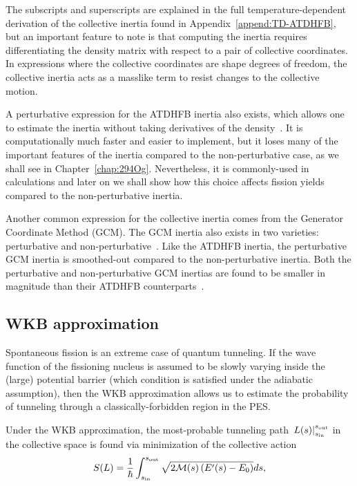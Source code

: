 \noindent The subscripts and superscripts are explained in the full temperature-dependent derivation of the collective inertia found in Appendix~\ref{append:TD-ATDHFB}, but an important feature to note is that computing the inertia requires differentiating the density matrix with respect to a pair of collective coordinates. In expressions where the collective coordinates are shape degrees of freedom, the collective inertia acts as a masslike term to resist changes to the collective motion.

A perturbative expression for the ATDHFB inertia also exists, which allows one to estimate the inertia without taking derivatives of the density~\cite{Baran2011}. It is computationally much faster and easier to implement, but it loses many of the important features of the inertia compared to the non-perturbative case, as we shall see in Chapter~\ref{chap:294Og}. Nevertheless, it is commonly-used in calculations and later on we shall show how this choice affects fission yields compared to the non-perturbative inertia.

Another common expression for the collective inertia comes from the Generator Coordinate Method (GCM). The GCM inertia also exists in two varieties: perturbative and non-perturbative~\cite{giuliani2018b}. Like the ATDHFB inertia, the perturbative GCM inertia is smoothed-out compared to the non-perturbative inertia. Both the perturbative and non-perturbative GCM inertias are found to be smaller in magnitude than their ATDHFB counterparts~\cite{Fiolhais1983,giuliani2018b}.

\subsection{WKB approximation}\label{sect:wkb}
Spontaneous fission is an extreme case of quantum tunneling. If the wave function of the fissioning nucleus is assumed to be slowly varying inside the (large) potential barrier (which condition is satisfied under the adiabatic assumption), then the WKB approximation allows us to estimate the probability of tunneling through a classically-forbidden region in the PES.

Under the WKB approximation, the most-probable tunneling path $\left. L(s) \right|_{s_{\rm in}}^{s_{\rm out}}$ in the collective space is found via minimization of the collective action
\begin{equation}\label{eq:action} 
S(L) = \frac{1}{\hbar}\int_{s_{\rm in}}^{s_{\rm out}} \sqrt{2\mathcal{M}(s)\left(E'(s)-E_0\right)}ds,
\end{equation} 

